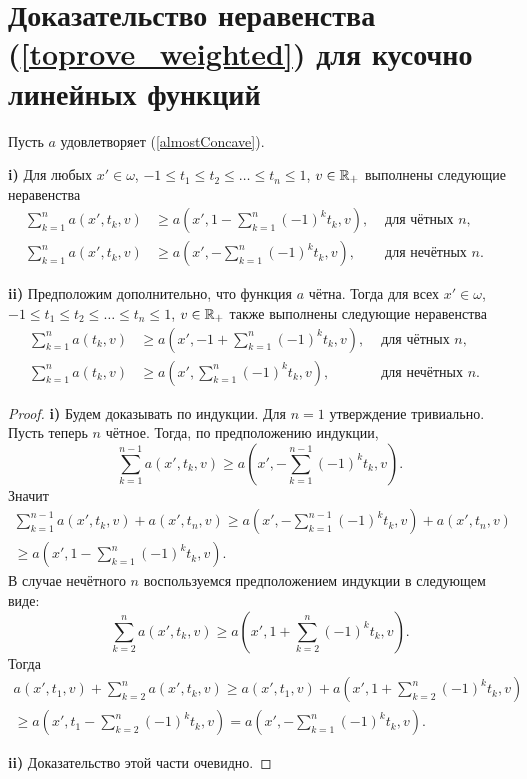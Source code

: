 \section{Доказательство неравенства (\ref{toprove_weighted}) для кусочно ли\-ней\-ных функций}

\begin{lm}
\label{weightSum}
Пусть $a$ удовлетворяет (\ref{almostConcave}).

\textbf{\textup{i)}}
Для любых $x' \in \omega$, $-1 \le t_1 \le t_2 \le \ldots \le t_n \le 1$, $v \in \mathbb R_+$ выполнены следующие неравенства
\begin{align*}
\sum_{k = 1}^n a(x', t_k, v) & \ge a( x', 1 - \sum_{k = 1}^n (-1)^k t_k, v ), & \text{ для чётных $n$}, & \\
\sum_{k = 1}^n a(x', t_k, v) & \ge a( x', - \sum_{k = 1}^n (-1)^k t_k, v ),   & \text{ для нечётных $n$}. &
\end{align*}

\textbf{\textup{ii)}}
Предположим дополнительно, что функция $a$ чётна.
Тогда для всех $x' \in \omega$, $-1 \le t_1 \le t_2 \le \ldots \le t_n \le 1$, $v \in \mathbb R_+$ также выполнены следующие неравенства
\begin{align*}
\sum_{k = 1}^n a(t_k, v) & \ge a( x', -1 + \sum_{k = 1}^n (-1)^k t_k, v ), & \text{ для чётных $n$}, & \\
\sum_{k = 1}^n a(t_k, v) & \ge a( x', \sum_{k = 1}^n (-1)^k t_k, v ),      & \text{ для нечётных $n$}. &
\end{align*}
\end{lm}

\begin{proof}
\textbf{\textup{i)}}
Будем доказывать по индукции.
Для $n = 1$ утверждение тривиально.
Пусть теперь $n$ чётное.
Тогда, по предположению индукции,
$$
\sum_{k=1}^{n - 1} a(x', t_k, v) \ge a( x', -\sum_{k = 1}^{n - 1} (-1)^k t_k, v ).
$$
Значит
\begin{multline*}
\sum_{k = 1}^{n - 1} a( x', t_k, v ) + a( x', t_n, v )
\ge a( x', -\sum_{k = 1}^{n - 1} (-1)^k t_k, v ) + a( x', t_n, v )
\\ \ge a( x', 1 - \sum_{k = 1}^{n} (-1)^k t_k, v ).
\end{multline*}
В случае нечётного $n$ воспользуемся предположением индукции в следующем виде:
$$
\sum_{k=2}^n a(x', t_k, v) \ge a( x', 1 + \sum_{k = 2}^n (-1)^k t_k, v ).
$$
Тогда
\begin{multline*}
a( x', t_1, v ) + \sum_{k = 2}^n a( x', t_k, v )
\ge a( x', t_1, v ) + a( x', 1 + \sum_{k = 2}^{n} (-1)^k t_k, v )
\\ \ge a( x', t_1 - \sum_{k = 2}^{n} (-1)^k t_k, v ) = a( x', -\sum_{k = 1}^{n} (-1)^k t_k, v ).
\end{multline*}

\textbf{\textup{ii)}} Доказательство этой части очевидно.
\end{proof}


